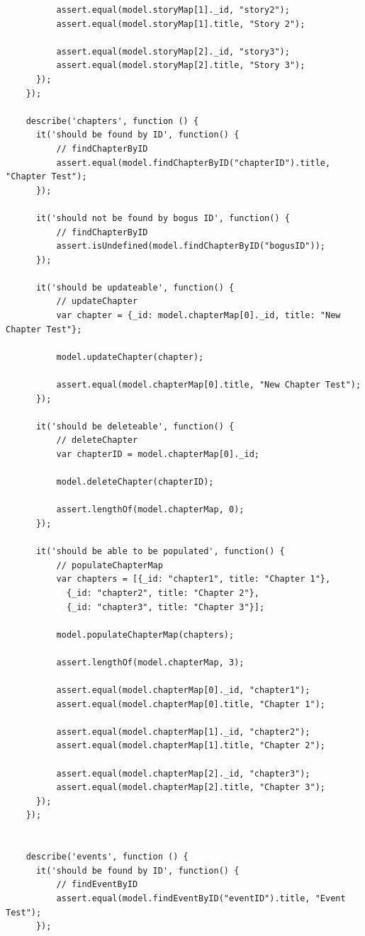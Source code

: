 \documentclass[12pt]{ucthesis}
\begin{document}
\begin{lstlisting}
          assert.equal(model.storyMap[1]._id, "story2");
          assert.equal(model.storyMap[1].title, "Story 2");

          assert.equal(model.storyMap[2]._id, "story3");
          assert.equal(model.storyMap[2].title, "Story 3");
      });
    });
    
    describe('chapters', function () {
      it('should be found by ID', function() {
          // findChapterByID
          assert.equal(model.findChapterByID("chapterID").title, "Chapter Test");
      });
      
      it('should not be found by bogus ID', function() {
          // findChapterByID
          assert.isUndefined(model.findChapterByID("bogusID")); 
      });

      it('should be updateable', function() {
          // updateChapter
          var chapter = {_id: model.chapterMap[0]._id, title: "New Chapter Test"};

          model.updateChapter(chapter);

          assert.equal(model.chapterMap[0].title, "New Chapter Test");
      });

      it('should be deleteable', function() {
          // deleteChapter
          var chapterID = model.chapterMap[0]._id;

          model.deleteChapter(chapterID);

          assert.lengthOf(model.chapterMap, 0);
      });

      it('should be able to be populated', function() {
          // populateChapterMap
          var chapters = [{_id: "chapter1", title: "Chapter 1"}, 
            {_id: "chapter2", title: "Chapter 2"}, 
            {_id: "chapter3", title: "Chapter 3"}];

          model.populateChapterMap(chapters);

          assert.lengthOf(model.chapterMap, 3);

          assert.equal(model.chapterMap[0]._id, "chapter1");
          assert.equal(model.chapterMap[0].title, "Chapter 1");

          assert.equal(model.chapterMap[1]._id, "chapter2");
          assert.equal(model.chapterMap[1].title, "Chapter 2");

          assert.equal(model.chapterMap[2]._id, "chapter3");
          assert.equal(model.chapterMap[2].title, "Chapter 3");
      });
    });


    describe('events', function () {
      it('should be found by ID', function() {
          // findEventByID
          assert.equal(model.findEventByID("eventID").title, "Event Test");
      });
      

\end{lstlisting}
\end{document}

